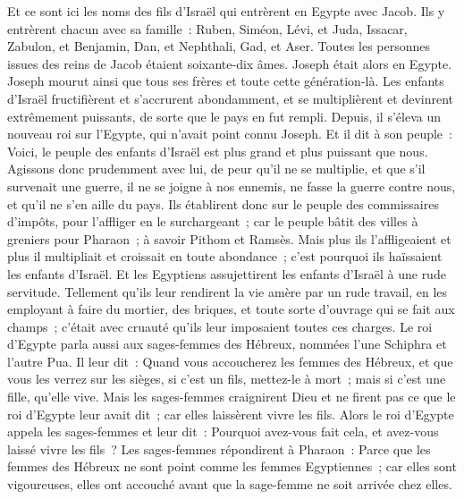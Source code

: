 \begin{multicols}{2}
\VerseOne{}Et ce sont ici les noms des fils d'Israël qui entrèrent en Egypte avec Jacob. Ils y entrèrent chacun avec sa famille~:
Ruben, Siméon, Lévi, et Juda,
Issacar, Zabulon, et Benjamin,
Dan, et Nephthali, Gad, et Aser.
Toutes les personnes issues des reins de Jacob étaient soixante-dix âmes. Joseph était alors en Egypte.
Joseph mourut ainsi que tous ses frères et toute cette génération-là.
Les enfants d'Israël fructifièrent et s'accrurent abondamment, et se multiplièrent et devinrent extrêmement puissants, de sorte que le pays en fut rempli.
Depuis, il s'éleva un nouveau roi sur l'Egypte, qui n'avait point connu Joseph.
Et il dit à son peuple~: Voici, le peuple des enfants d'Israël est plus grand et plus puissant que nous.
Agissons donc prudemment avec lui, de peur qu'il ne se multiplie, et que s'il survenait une guerre, il ne se joigne à nos ennemis, ne fasse la guerre contre nous, et qu'il ne s'en aille du pays.
Ils établirent donc sur le peuple des commissaires d'impôts, pour l'affliger en le surchargeant~; car le peuple bâtit des villes à greniers pour Pharaon~; à savoir Pithom et Ramsès.
Mais plus ils l'affligeaient et plus il multipliait et croissait en toute abondance~; c'est pourquoi ils haïssaient les enfants d'Israël.
Et les Egyptiens assujettirent les enfants d'Israël à une rude servitude.
Tellement qu'ils leur rendirent la vie amère par un rude travail, en les employant à faire du mortier, des briques, et toute sorte d'ouvrage qui se fait aux champs~; c'était avec cruauté qu'ils leur imposaient toutes ces charges.
Le roi d'Egypte parla aussi aux sages-femmes des Hébreux, nommées l'une Schiphra et l'autre Pua.
Il leur dit~: Quand vous accoucherez les femmes des Hébreux, et que vous les verrez sur les sièges, si c'est un fils, mettez-le à mort~; mais si c'est une fille, qu'elle vive.
Mais les sages-femmes craignirent Dieu et ne firent pas ce que le roi d'Egypte leur avait dit~; car elles laissèrent vivre les fils.
Alors le roi d'Egypte appela les sages-femmes et leur dit~: Pourquoi avez-vous fait cela, et avez-vous laissé vivre les fils~?
Les sages-femmes répondirent à Pharaon~: Parce que les femmes des Hébreux ne sont point comme les femmes Egyptiennes~; car elles sont vigoureuses, elles ont accouché avant que la sage-femme ne soit arrivée chez elles.

\end{multicols}
